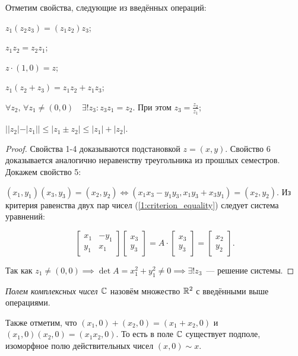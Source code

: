 Отметим свойства, следующие из введённых операций:

\begin{properties}
\item \(z_1 (z_2 z_3) = (z_1 z_2) z_3\);
\item \(z_1 z_2 = z_2 z_1\);
\item \(z \cdot (1, 0) = z\);
\item \(z_1 (z_2 + z_3) = z_1 z_2 + z_1 z_3\);
\item \(\forall z_2, \, \forall z_1 \neq (0, 0) \quad \exists! z_3 \colon z_3 z_1 = z_2\). При этом
    \(z_3 = \frac{z_2}{z_1}\);
\item $||z_2| - |z_1|| \le |z_1 \pm z_2| \le |z_1| + |z_2|$.
\end{properties}

\begin{proof}
Свойства 1-4 доказываются подстановкой \(z = (x, y)\). Свойство 6 доказывается аналогично
неравенству треугольника из прошлых семестров. Докажем свойство 5:

\((x_1, y_1) (x_3, y_3) = (x_2, y_2) \iff (x_1 x_3 - y_1 y_3, x_1 y_3 + x_3 y_1) = (x_2, y_2)\). Из
критерия равенства двух пар чисел (\ref{1:criterion_equality}) следует система уравнений:

\[
    \begin{bmatrix}
        x_1 & -y_1 \\
        y_1 & x_1
    \end{bmatrix}
    \begin{bmatrix}
        x_3 \\
        y_3
    \end{bmatrix}
    =
    A \cdot
    \begin{bmatrix}
        x_3 \\
        y_3
    \end{bmatrix}
    =
    \begin{bmatrix}
        x_2 \\
        y_2
    \end{bmatrix}.\]

Так как \(z_1 \neq (0, 0) \implies \det{A} = x_1^2 + y_1^2 \neq 0 \implies \exists! z_3\)~---
решение системы.
\end{proof}

\begin{definition}
\textit{Полем комплексных чисел \(\mathbb{C}\)} назовём множество \(\mathbb{R}^2\) с введёнными выше операциями.
\end{definition}

Также отметим, что \((x_1, 0) + (x_2, 0) = (x_1 + x_2, 0)\) и \((x_1, 0) (x_2, 0) = (x_1 x_2, 0)\).
То есть в поле \(\mathbb{C}\) существует подполе, изоморфное полю действительных чисел \((x, 0) \sim x\).

